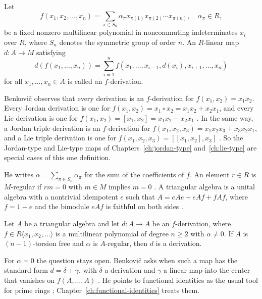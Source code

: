 \begin{definition}\label{def:f:polynomial}
Let
\[ f(x_1,x_2,\dots,x_n)=\sum_{\pi\in S_n}\alpha_\pi x_{\pi(1)}x_{\pi(2)}\cdots x_{\pi(n)},
\quad \alpha_\pi\in R, \tag{1.1} \]
be a fixed nonzero multilinear polynomial in noncommuting indeterminates $x_i$ over
$R$, where $S_n$ denotes the symmetric group of order $n$. An $R$-linear map
$d:A\to M$ satisfying
\[ d(f(x_1,\dots,x_n))=\sum_{i=1}^{n}f(x_1,\dots,x_{i-1},d(x_i),x_{i+1},\dots,x_n) \tag{1.2} \]
for all $x_1,\dots,x_n\in A$ is called an $f$-derivation.
\end{definition}

Benkovič observes that every derivation is an $f$-derivation for $f(x_1,x_2)=x_1x_2$.
Every Jordan derivation is one for $f(x_1,x_2)=x_1\circ x_2=x_1x_2+x_2x_1$, and every
Lie derivation is one for $f(x_1,x_2)=[x_1,x_2]=x_1x_2-x_2x_1$
\cite[Section~1]{Benkovic2014}. In the same way, a Jordan triple derivation is an
$f$-derivation for $f(x_1,x_2,x_3)=x_1x_2x_3+x_3x_2x_1$, and a Lie triple derivation is
one for $f(x_1,x_2,x_3)=[[x_1,x_2],x_3]$ \cite[Section~1]{Benkovic2014}. So the
Jordan-type and Lie-type maps of Chapters~\ref{ch:jordan-type} and~\ref{ch:lie-type}
are special cases of this one definition.

He writes $\alpha=\sum_{\pi\in S_n}\alpha_\pi$ for the sum of the coefficients of $f$.
An element $r\in R$ is $M$-regular if $rm=0$ with $m\in M$ implies $m=0$
\cite[Section~1]{Benkovic2014}. A triangular algebra is a unital algebra with a
nontrivial idempotent $e$ such that $A=eAe+eAf+fAf$, where $f=1-e$ and the bimodule
$eAf$ is faithful on both sides \cite[Section~1]{Benkovic2014}.

\begin{theorem}\label{thm:f:triangular}
Let $A$ be a triangular algebra and let $d:A\to A$ be an $f$-derivation, where
$f\in R\langle x_1,x_2,\dots\rangle$ is a multilinear polynomial of degree $n\ge2$
with $\alpha\ne0$. If $A$ is $(n-1)$-torsion free and $\alpha$ is $A$-regular, then $d$
is a derivation.
\end{theorem}

For $\alpha=0$ the question stays open. Benkovič asks when such a map has the standard
form $d=\delta+\gamma$, with $\delta$ a derivation and $\gamma$ a linear map into the
center that vanishes on $f(A,\dots,A)$ \cite[Problem~1.2]{Benkovic2014}. He points to
functional identities as the usual tool for prime rings
\cite[Section~1]{Benkovic2014}; Chapter~\ref{ch:functional-identities} treats them.

